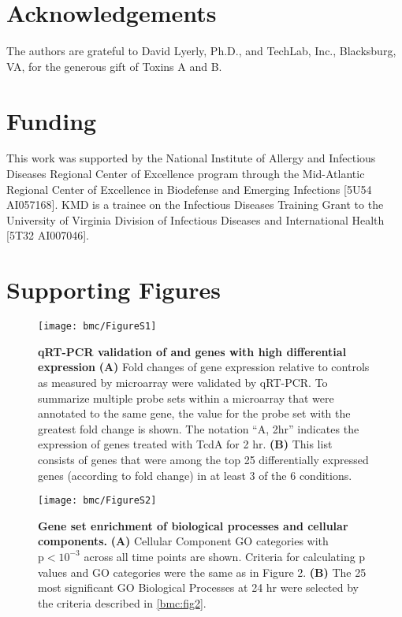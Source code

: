 \section{Acknowledgements}
The authors are grateful to David Lyerly, Ph.D., and 
TechLab, Inc., Blacksburg, VA, for the generous gift 
of Toxins A and B.

\section{Funding}
This work was supported by the National Institute of Allergy 
and Infectious Diseases Regional Center of Excellence 
program through the Mid-Atlantic Regional Center of 
Excellence in Biodefense and Emerging Infections 
[5U54 AI057168]. KMD is a trainee on the Infectious 
Diseases Training Grant to the University of Virginia 
Division of Infectious Diseases and International 
Health [5T32 AI007046].


\section{Supporting Figures}
\beginsupplement

\begin{figure}[h!]
  \centering
  \texttt{[image: bmc/FigureS1]}
  \caption[qRT-PCR validation of and genes with high differential expression]{
  \textbf{qRT-PCR validation of and genes with high differential expression}
  \textbf{(A)} Fold changes of gene expression relative 
  to controls as measured by microarray 
  were validated by qRT-PCR. To summarize 
  multiple probe sets within a microarray that 
  were annotated to the same gene, the value for 
  the probe set with the 
  greatest fold change is shown. The notation 
  ``A, 2hr'' indicates the expression 
  of genes treated with TcdA for 2 hr. 
  \textbf{(B)} This list consists of genes that 
  were among the top 25 differentially expressed 
  genes (according to fold change) in at 
  least 3 of the 6 conditions.}
  \label{bmc:figs1}
\end{figure}


\begin{sidewaysfigure}[h!]
  \centering
  \texttt{[image: bmc/FigureS2]}
  \caption[Gene set enrichment of biological processes and cellular components]{
  \textbf{Gene set enrichment of biological processes 
  and cellular components.}
  \textbf{(A)} Cellular Component GO categories 
  with $\text{p}<10^{-3}$ across all time points 
  are shown. Criteria for calculating p
  values and GO categories were the same 
  as in Figure 2.
  \textbf{(B)} The 25 most significant GO 
  Biological Processes at 24 hr were selected 
  by the criteria described in \autoref{bmc:fig2}.}
  \label{bmc:figs2}
\end{sidewaysfigure}


